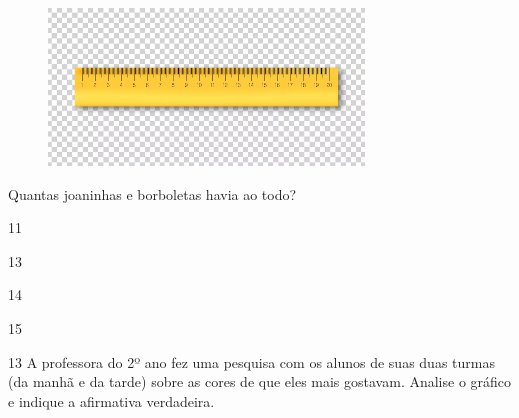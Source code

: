 \begin{figure}[htpb!]
\centering
\includegraphics[width=.7\textwidth]{./media/image135.png}
\end{figure}

\pagebreak
Quantas joaninhas e borboletas havia ao todo?

\begin{minipage}{.5\textwidth}
\begin{escolha}
\item 11

\item 13

\item 14

\item 15
\end{escolha}
\end{minipage}


\num{13} A professora do 2º ano fez uma pesquisa com os alunos de suas duas
turmas (da manhã e da tarde) sobre as cores de que eles mais gostavam.
Analise o gráfico e indique a afirmativa verdadeira.

